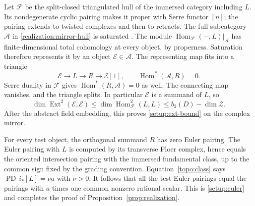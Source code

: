 \documentclass[11pt]{article}
\numberwithin{equation}{section}
\theoremstyle{definition}
\theoremstyle{remark}
\begin{document}
Let $\mathcal F$ be the split-closed triangulated hull of the immersed
category including $L$.  Its nondegenerate cyclic pairing makes it
proper with Serre functor $[n]$; the pairing extends to twisted complexes
and then to retracts.  The full subcategory $\mathcal A$ in
\eqref{realization:mirror-hull} is saturated
\cite{BondalVanDenBergh}.  The module
$\operatorname{Hom}_{\mathcal F}(-,L)|_{\mathcal A}$ has finite-dimensional total
cohomology at every object, by properness.  Saturation therefore
represents it by an object
$\mathcal E\in\mathcal A$.  The representing map fits into a triangle
\[
 \mathcal E\longrightarrow L\longrightarrow R\longrightarrow
 \mathcal E[1],
 \qquad \operatorname{Hom}^*(\mathcal A,R)=0.
\]
Serre duality in $\mathcal F$ gives
$\operatorname{Hom}^*(R,\mathcal A)=0$ as well.  The connecting map vanishes, and the
triangle splits.  In particular $\mathcal E$ is a summand of $L$, so
\[
 \dim\operatorname{Ext}^2(\mathcal E,\mathcal E)
 \le\dim\operatorname{Hom}^2_{\mathcal F}(L,L)
 \le b_2(D)-\dim\mathcal Z.
\]
After the abstract field embedding, this proves
\eqref{setup:ext-bound} on the complex mirror.

For every test object, the orthogonal summand $R$ has zero Euler
pairing.  The Euler pairing with $L$ is computed by its transverse
Floer complex, hence equals the oriented intersection pairing with
the immersed fundamental class, up to the common sign fixed by the
grading convention.  Equation~\eqref{topo:class} says
$\operatorname{PD}\,i_*[L]=\nu a$ with $\nu>0$.  It follows that all the test Euler
pairings equal the pairings with $a$ times one common nonzero rational
scalar.  This is \eqref{setup:euler} and completes the proof of
Proposition~\ref{prop:realization}.




\end{document}
